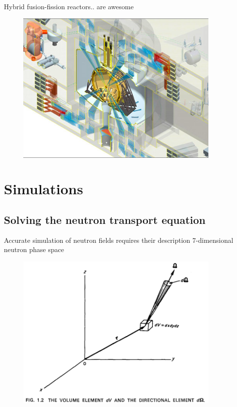\documentclass{beamer}
\begin{document}
        \begin{frame}{Hybrid fusion-fission reactors}{.. are awesome}
            \begin{figure}
                \centering
                \includegraphics[width=0.9\textwidth]{./img/lifeChamber.png}
                \caption*{}
            \end{figure}
        \end{frame}

\section{Simulations}

    \subsection{Solving the neutron transport equation}

        \begin{frame}{Accurate simulation of neutron fields requires their description 7-dimensional neutron phase space}
            \begin{figure}
                \centering
                \includegraphics[width=0.9\textwidth]{./img/phaseSpace.png}
            \end{figure}
        \end{frame}
\end{document}
